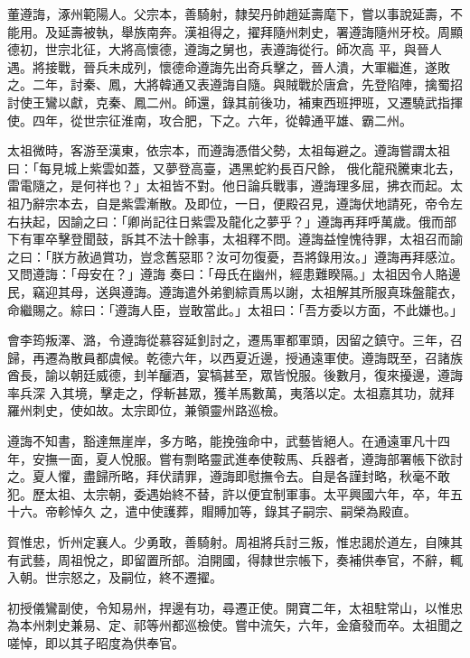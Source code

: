 \begin{pinyinscope}
 董遵誨，涿州範陽人。父宗本，善騎射，隸契丹帥趙延壽麾下，嘗以事說延壽，不能用。及延壽被執，舉族南奔。漢祖得之，擢拜隨州刺史，署遵誨隨州牙校。周顯德初，世宗北征，大將高懷德，遵誨之舅也，表遵誨從行。師次高
 平，與晉人遇。將接戰，晉兵未成列，懷德命遵誨先出奇兵擊之，晉人潰，大軍繼進，遂敗之。二年，討秦、鳳，大將韓通又表遵誨自隨。與賊戰於唐倉，先登陷陣，擒蜀招討使王鸞以獻，克秦、鳳二州。師還，錄其前後功，補東西班押班，又遷驍武指揮使。四年，從世宗征淮南，攻合肥，下之。六年，從韓通平雄、霸二州。



 太祖微時，客游至漢東，依宗本，而遵誨憑借父勢，太祖每避之。遵誨嘗謂太祖曰：「每見城上紫雲如蓋，又夢登高臺，遇黑蛇約長百尺餘，
 俄化龍飛騰東北去，雷電隨之，是何祥也？」太祖皆不對。他日論兵戰事，遵誨理多屈，拂衣而起。太祖乃辭宗本去，自是紫雲漸散。及即位，一日，便殿召見，遵誨伏地請死，帝令左右扶起，因諭之曰：「卿尚記往日紫雲及龍化之夢乎？」遵誨再拜呼萬歲。俄而部下有軍卒擊登聞鼓，訴其不法十餘事，太祖釋不問。遵誨益惶愧待罪，太祖召而諭之曰：「朕方赦過賞功，豈念舊惡耶？汝可勿復憂，吾將錄用汝。」遵誨再拜感泣。又問遵誨：「母安在？」遵誨
 奏曰：「母氏在幽州，經患難睽隔。」太祖因令人賂邊民，竊迎其母，送與遵誨。遵誨遣外弟劉綜貢馬以謝，太祖解其所服真珠盤龍衣，命繼賜之。綜曰：「遵誨人臣，豈敢當此。」太祖曰：「吾方委以方面，不此嫌也。」



 會李筠叛澤、潞，令遵誨從慕容延釗討之，遷馬軍都軍頭，因留之鎮守。三年，召歸，再遷為散員都虞候。乾德六年，以西夏近邊，授通遠軍使。遵誨既至，召諸族酋長，諭以朝廷威德，刲羊釃酒，宴犒甚至，眾皆悅服。後數月，復來擾邊，遵誨率兵深
 入其境，擊走之，俘斬甚眾，獲羊馬數萬，夷落以定。太祖嘉其功，就拜羅州刺史，使如故。太宗即位，兼領靈州路巡檢。



 遵誨不知書，豁達無崖岸，多方略，能挽強命中，武藝皆絕人。在通遠軍凡十四年，安撫一面，夏人悅服。嘗有剽略靈武進奉使鞍馬、兵器者，遵誨部署帳下欲討之。夏人懼，盡歸所略，拜伏請罪，遵誨即慰撫令去。自是各謹封略，秋毫不敢犯。歷太祖、太宗朝，委遇始終不替，許以便宜制軍事。太平興國六年，卒，年五十六。帝軫悼久
 之，遣中使護葬，賵賻加等，錄其子嗣宗、嗣榮為殿直。



 賀惟忠，忻州定襄人。少勇敢，善騎射。周祖將兵討三叛，惟忠謁於道左，自陳其有武藝，周祖悅之，即留置所部。洎開國，得隸世宗帳下，奏補供奉官，不辭，輒入朝。世宗怒之，及嗣位，終不遷擢。



 初授儀鸞副使，令知易州，捍邊有功，尋遷正使。開寶二年，太祖駐常山，以惟忠為本州刺史兼易、定、祁等州都巡檢使。嘗中流矢，六年，金瘡發而卒。太祖聞之嗟悼，即以其子昭度為供奉官。




\end{pinyinscope}
